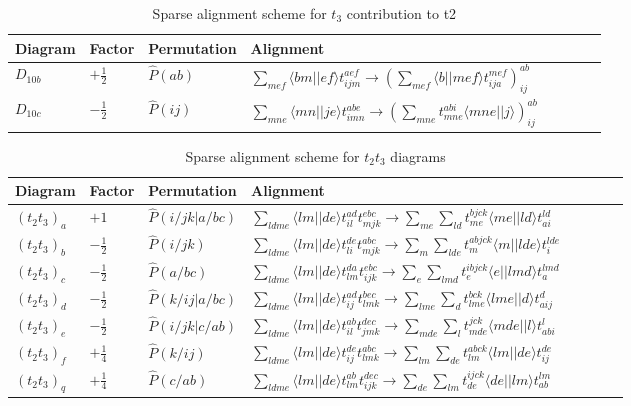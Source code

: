 \begin{table}[hbpt]
\centering
\caption{Sparse alignment scheme for $t_3$ contribution to t2}
\label{tab:sparse_alignments_t3CCD}
\begin{tabular}{llllllll}
Diagram  & Factor & Permutation & Alignment  \\ \hline
$D_{10b}$&$+\frac{1}{2}$& $\hat{P}(ab)$ & $\sum_{mef} \langle bm \vert \vert ef \rangle t^{aef}_{ijm} \rightarrow (\sum_{mef} \langle b \vert \vert mef \rangle t^{mef}_{ija})^{ab}_{ij} $  \\
$D_{10c}$&$-\frac{1}{2}$& $\hat{P}(ij)$ & $\sum_{mne} \langle mn \vert \vert je \rangle t^{abe}_{imn} \rightarrow (\sum_{mne} t^{abi}_{mne} \langle mne \vert \vert j \rangle)^{ab}_{ij}  $  \\
\end{tabular}
\end{table}

\begin{table}[hbpt]
\centering
\caption{Sparse alignment scheme for $t_2 t_3$ diagrams}
\label{tab:sparse_alignments_t2t3}
\begin{tabular}{llllllll}
Diagram & Factor & Permutation & Alignment  \\ \hline
$(t_2 t_3)_a $&$+1$&$\hat{P}(i/jk \vert a/bc)$&$  \sum_{ldme} \langle l m \vert \vert d e \rangle t^{a d}_{i l}t^{e b c}_{m j k}  \rightarrow  \sum_{me} \sum_{ld} t^{bjck}_{me} \langle me\vert \vert ld\rangle t^{ld}_{ai} $ \\
$(t_2 t_3)_b $&$-\frac{1}{2}$&$\hat{P}(i/jk)$&$  \sum_{ldme} \langle l m \vert \vert d e \rangle t^{d e}_{l i}t^{a b c}_{m j k}  \rightarrow  \sum_{m} \sum_{lde} t^{abjck}_{m} \langle m\vert \vert lde\rangle t^{lde}_{i} $ \\
$(t_2 t_3)_c $&$-\frac{1}{2}$&$\hat{P}(a/bc)$&$  \sum_{ldme} \langle l m \vert \vert d e \rangle t^{d a}_{l m}t^{e b c}_{i j k}  \rightarrow  \sum_{e} \sum_{lmd} t^{ibjck}_{e} \langle e\vert \vert lmd\rangle t^{lmd}_{a} $\\
$(t_2 t_3)_d $&$-\frac{1}{2}$&$\hat{P}(k/ij \vert a/bc)$&$  \sum_{ldme} \langle l m \vert \vert d e \rangle t^{a d}_{i j}t^{b e c}_{l m k}  \rightarrow  \sum_{lme} \sum_{d} t^{bck}_{lme} \langle lme\vert \vert d\rangle t^{d}_{aij} $ \\
$(t_2 t_3)_e $&$-\frac{1}{2}$&$\hat{P}(i/jk \vert c/ab)$&$  \sum_{ldme} \langle l m \vert \vert d e \rangle t^{a b}_{i l}t^{d e c}_{j m k}  \rightarrow  \sum_{mde} \sum_{l} t^{jck}_{mde} \langle mde\vert \vert l\rangle t^{l}_{abi} $ \\
$(t_2 t_3)_f $&$+\frac{1}{4}$&$\hat{P}(k/ij)$&$  \sum_{ldme} \langle l m \vert \vert d e \rangle t^{d e}_{i j}t^{a b c}_{l m k}  \rightarrow  \sum_{lm} \sum_{de} t^{abck}_{lm} \langle lm\vert \vert de\rangle t^{de}_{ij} $ \\
$(t_2 t_3)_q $&$+\frac{1}{4}$&$\hat{P}(c/ab)$&$  \sum_{ldme} \langle l m \vert \vert d e \rangle t^{a b}_{l m}t^{d e c}_{i j k}  \rightarrow  \sum_{de} \sum_{lm} t^{ijck}_{de} \langle de\vert \vert lm\rangle t^{lm}_{ab} $ \\
\end{tabular}
\end{table}

